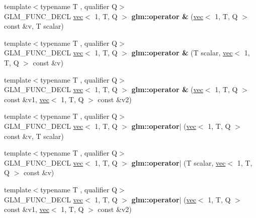 \begin{DoxyCompactItemize}
\item 
\mbox{\label{group__ext__vec1_ga62a75b0dadc3e908b03bf03bee891e6d}} 
{\footnotesize template$<$typename T , qualifier Q$>$ }\\G\+L\+M\+\_\+\+F\+U\+N\+C\+\_\+\+D\+E\+CL \hyperlink{structglm_1_1vec}{vec}$<$ 1, T, Q $>$ {\bfseries glm\+::operator \&} (\hyperlink{structglm_1_1vec}{vec}$<$ 1, T, Q $>$ const \&v, T scalar)
\item 
\mbox{\label{group__ext__vec1_ga6637b42fbf149b977ce3f66571be212a}} 
{\footnotesize template$<$typename T , qualifier Q$>$ }\\G\+L\+M\+\_\+\+F\+U\+N\+C\+\_\+\+D\+E\+CL \hyperlink{structglm_1_1vec}{vec}$<$ 1, T, Q $>$ {\bfseries glm\+::operator \&} (T scalar, \hyperlink{structglm_1_1vec}{vec}$<$ 1, T, Q $>$ const \&v)
\item 
\mbox{\label{group__ext__vec1_ga9f942c4c4e896e42f1810824f7af294b}} 
{\footnotesize template$<$typename T , qualifier Q$>$ }\\G\+L\+M\+\_\+\+F\+U\+N\+C\+\_\+\+D\+E\+CL \hyperlink{structglm_1_1vec}{vec}$<$ 1, T, Q $>$ {\bfseries glm\+::operator \&} (\hyperlink{structglm_1_1vec}{vec}$<$ 1, T, Q $>$ const \&v1, \hyperlink{structglm_1_1vec}{vec}$<$ 1, T, Q $>$ const \&v2)
\item 
\mbox{\label{group__ext__vec1_ga4cb746ab6c11e1f5228e1468afcc0bfb}} 
{\footnotesize template$<$typename T , qualifier Q$>$ }\\G\+L\+M\+\_\+\+F\+U\+N\+C\+\_\+\+D\+E\+CL \hyperlink{structglm_1_1vec}{vec}$<$ 1, T, Q $>$ {\bfseries glm\+::operator$\vert$} (\hyperlink{structglm_1_1vec}{vec}$<$ 1, T, Q $>$ const \&v, T scalar)
\item 
\mbox{\label{group__ext__vec1_gaee2907e10f2307c2e36147741400da29}} 
{\footnotesize template$<$typename T , qualifier Q$>$ }\\G\+L\+M\+\_\+\+F\+U\+N\+C\+\_\+\+D\+E\+CL \hyperlink{structglm_1_1vec}{vec}$<$ 1, T, Q $>$ {\bfseries glm\+::operator$\vert$} (T scalar, \hyperlink{structglm_1_1vec}{vec}$<$ 1, T, Q $>$ const \&v)
\item 
\mbox{\label{group__ext__vec1_ga837171e73bbc4fe6d067f275947f1b34}} 
{\footnotesize template$<$typename T , qualifier Q$>$ }\\G\+L\+M\+\_\+\+F\+U\+N\+C\+\_\+\+D\+E\+CL \hyperlink{structglm_1_1vec}{vec}$<$ 1, T, Q $>$ {\bfseries glm\+::operator$\vert$} (\hyperlink{structglm_1_1vec}{vec}$<$ 1, T, Q $>$ const \&v1, \hyperlink{structglm_1_1vec}{vec}$<$ 1, T, Q $>$ const \&v2)

\end{DoxyCompactItemize}
